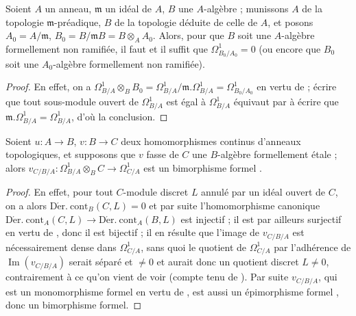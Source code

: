 \begin{corollary}[20.7.5]
\label{0.20.7.5-fr}
Soient $A$ un anneau, $\mathfrak{m}$ un idéal de $A$, $B$ une $A$-algèbre ;
munissons $A$ de la topologie $\mathfrak{m}$-préadique, $B$ de la topologie
déduite de celle de $A$, et posons $A_0=A/\mathfrak{m}$,
$B_0=B/\mathfrak{m}B=B\otimes_A A_0$. Alors, pour que $B$ soit une
$A$-algèbre formellement non ramifiée, il faut et il suffit que
$\Omega^1_{B_0/A_0}=0$ (ou encore que $B_0$ soit une $A_0$-algèbre
formellement non ramifiée).
\end{corollary}

\begin{proof}
En effet, on a
$\Omega^1_{B/A}\otimes_B B_0=\Omega^1_{B/A}/\mathfrak{m}.\Omega^1_{B/A}
=\Omega^1_{B_0/A_0}$ en vertu de  ; écrire que tout
sous-module ouvert de $\Omega^1_{B/A}$ est égal à $\Omega^1_{B/A}$ équivaut
par  à écrire que
$\mathfrak{m}.\Omega^1_{B/A}=\Omega^1_{B/A}$, d'où la conclusion.
\end{proof}

\begin{proposition}[20.7.6]
\label{0.20.7.6-fr}
Soient $u:A\to B$, $v:B\to C$ deux homomorphismes continus d'anneaux
topologiques, et supposons que $v$ fasse de $C$ une $B$-algèbre formellement
étale ; alors $v_{C/B/A}:\Omega^1_{B/A}\otimes_B C\to\Omega^1_{C/A}$ est un
bimorphisme formel .
\end{proposition}

\begin{proof}
En effet, pour tout $C$-module discret $L$ annulé par un idéal ouvert de $C$,
on a alors 
$\operatorname{D\acute{e}r.\ cont}_B(C,L)=0$ et par suite
 l'homomorphisme canonique
$\operatorname{D\acute{e}r.\ cont}_A(C,L)\to
\operatorname{D\acute{e}r.\ cont}_A(B,L)$ est injectif ; il est par ailleurs
surjectif en vertu de , donc il est bijectif ; il en résulte
que l'image de $v_{C/B/A}$ est nécessairement dense dans $\Omega^1_{C/A}$,
sans quoi le quotient de $\Omega^1_{C/A}$ par l'adhérence de
$\operatorname{Im}(v_{C/B/A})$ serait séparé et $\neq0$ et aurait donc un
quotient discret $L\neq0$, contrairement à ce qu'on vient de voir (compte tenu
de ). Par suite $v_{C/B/A}$, qui est un monomorphisme formel
en vertu de , est aussi un épimorphisme formel
, donc un bimorphisme formel.
\end{proof}

